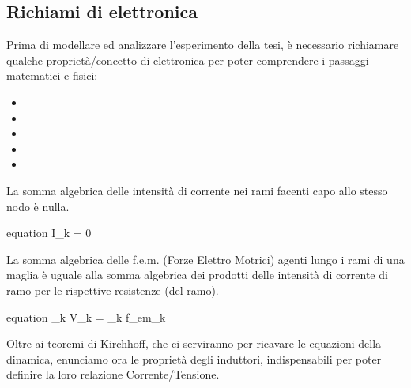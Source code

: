 \subsection{Richiami di elettronica}
Prima di modellare ed analizzare l'esperimento della tesi, è necessario richiamare qualche proprietà/concetto di elettronica per poter comprendere i passaggi matematici e fisici:
\vspace{-5mm}
\begin{itemize}[itemsep=-4mm]
	\item {}
	\item {}
	\item {}
	\item {}
	\item {}
\end{itemize}


\begin{teorema}
	La somma algebrica delle intensità di corrente nei rami facenti capo allo stesso nodo è nulla.
	\begin{empheq}[box=\mathStep]{equation} \label{eq:KirchhoffNodi}
		\sum I_k = 0
	\end{empheq}
\end{teorema}

\begin{teorema}
	La somma algebrica delle f.e.m. (Forze Elettro Motrici) agenti lungo i rami di una maglia è uguale alla somma algebrica dei prodotti delle intensità di corrente di ramo per le rispettive resistenze (del ramo).
	\begin{empheq}[box=\mathStep]{equation} \label{eq:KirchhoffMaglie}
		\sum_{\forall k} V_k = \sum_{\forall k} f_{em_k}
	\end{empheq}
\end{teorema}
\vspace{-3mm}
\noindent
Oltre ai teoremi di Kirchhoff, che ci serviranno per ricavare le equazioni della dinamica, enunciamo ora le proprietà degli induttori, indispensabili per poter definire la loro relazione Corrente/Tensione.

